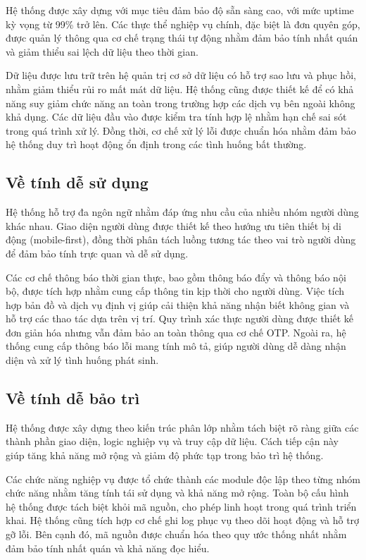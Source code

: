 \documentclass[../main.tex]{subfiles}%
\begin{document}
Hệ thống được xây dựng với mục tiêu đảm bảo độ sẵn sàng cao, với mức uptime kỳ vọng từ 99\% trở lên. Các thực thể nghiệp vụ chính, đặc biệt là đơn quyên góp, được quản lý thông qua cơ chế trạng thái tự động nhằm đảm bảo tính nhất quán và giảm thiểu sai lệch dữ liệu theo thời gian.

Dữ liệu được lưu trữ trên hệ quản trị cơ sở dữ liệu có hỗ trợ sao lưu và phục hồi, nhằm giảm thiểu rủi ro mất mát dữ liệu. Hệ thống cũng được thiết kế để có khả năng suy giảm chức năng an toàn trong trường hợp các dịch vụ bên ngoài không khả dụng. Các dữ liệu đầu vào được kiểm tra tính hợp lệ nhằm hạn chế sai sót trong quá trình xử lý. Đồng thời, cơ chế xử lý lỗi được chuẩn hóa nhằm đảm bảo hệ thống duy trì hoạt động ổn định trong các tình huống bất thường.

\subsection{Về tính dễ sử dụng}
\label{section:2.5.3}

Hệ thống hỗ trợ đa ngôn ngữ nhằm đáp ứng nhu cầu của nhiều nhóm người dùng khác nhau. Giao diện người dùng được thiết kế theo hướng ưu tiên thiết bị di động (mobile-first), đồng thời phân tách luồng tương tác theo vai trò người dùng để đảm bảo tính trực quan và dễ sử dụng.

Các cơ chế thông báo thời gian thực, bao gồm thông báo đẩy và thông báo nội bộ, được tích hợp nhằm cung cấp thông tin kịp thời cho người dùng. Việc tích hợp bản đồ và dịch vụ định vị giúp cải thiện khả năng nhận biết không gian và hỗ trợ các thao tác dựa trên vị trí. Quy trình xác thực người dùng được thiết kế đơn giản hóa nhưng vẫn đảm bảo an toàn thông qua cơ chế OTP. Ngoài ra, hệ thống cung cấp thông báo lỗi mang tính mô tả, giúp người dùng dễ dàng nhận diện và xử lý tình huống phát sinh.

\subsection{Về tính dễ bảo trì}
\label{section:2.5.4}

Hệ thống được xây dựng theo kiến trúc phân lớp nhằm tách biệt rõ ràng giữa các thành phần giao diện, logic nghiệp vụ và truy cập dữ liệu. Cách tiếp cận này giúp tăng khả năng mở rộng và giảm độ phức tạp trong bảo trì hệ thống.

Các chức năng nghiệp vụ được tổ chức thành các module độc lập theo từng nhóm chức năng nhằm tăng tính tái sử dụng và khả năng mở rộng. Toàn bộ cấu hình hệ thống được tách biệt khỏi mã nguồn, cho phép linh hoạt trong quá trình triển khai. Hệ thống cũng tích hợp cơ chế ghi log phục vụ theo dõi hoạt động và hỗ trợ gỡ lỗi. Bên cạnh đó, mã nguồn được chuẩn hóa theo quy ước thống nhất nhằm đảm bảo tính nhất quán và khả năng đọc hiểu.
\end{document}
